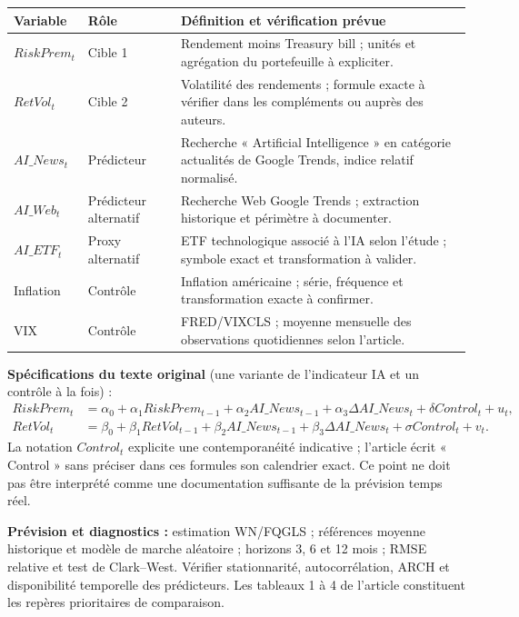 \documentclass[11pt,a4paper]{article}
\begin{document}
\smallskip
\begin{center}
\footnotesize
\renewcommand{\arraystretch}{1.16}
\begin{tabularx}{\textwidth}{@{}p{2.75cm}p{2.15cm}X@{}}
\toprule
\textbf{Variable} & \textbf{Rôle} & \textbf{Définition et vérification prévue}\\
\midrule
$RiskPrem_t$ & Cible 1 & Rendement moins Treasury bill ; unités et agrégation du portefeuille à expliciter.\\
$RetVol_t$ & Cible 2 & Volatilité des rendements ; formule exacte à vérifier dans les compléments ou auprès des auteurs.\\
$AI\_News_t$ & Prédicteur & Recherche « Artificial Intelligence » en catégorie actualités de Google Trends, indice relatif normalisé.\\
$AI\_Web_t$ & Prédicteur alternatif & Recherche Web Google Trends ; extraction historique et périmètre à documenter.\\
$AI\_ETF_t$ & Proxy alternatif & ETF technologique associé à l'IA selon l'étude ; symbole exact et transformation à valider.\\
Inflation & Contrôle & Inflation américaine ; série, fréquence et transformation exacte à confirmer.\\
VIX & Contrôle & FRED/VIXCLS ; moyenne mensuelle des observations quotidiennes selon l'article.\\
\bottomrule
\end{tabularx}
\end{center}
\vspace{0.1cm}
\textbf{Spécifications du texte original} (une variante de l'indicateur IA et un contrôle à la fois) :
\begin{align}
RiskPrem_t &= \alpha_0+\alpha_1RiskPrem_{t-1}+\alpha_2AI\_News_{t-1}
 +\alpha_3\Delta AI\_News_t+\delta Control_t+u_t,\\
RetVol_t &= \beta_0+\beta_1RetVol_{t-1}+\beta_2AI\_News_{t-1}
 +\beta_3\Delta AI\_News_t+\sigma Control_t+v_t.
\end{align}
La notation $Control_t$ explicite une contemporanéité indicative ; l'article écrit « Control » sans préciser dans ces formules son calendrier exact. Ce point ne doit pas être interprété comme une documentation suffisante de la prévision temps réel.

\smallskip
\textbf{Prévision et diagnostics :} estimation WN/FQGLS ; références moyenne historique et modèle de marche aléatoire ; horizons 3, 6 et 12 mois ; RMSE relative et test de Clark--West. Vérifier stationnarité, autocorrélation, ARCH et disponibilité temporelle des prédicteurs. Les tableaux 1 à 4 de l'article constituent les repères prioritaires de comparaison.
\end{document}
